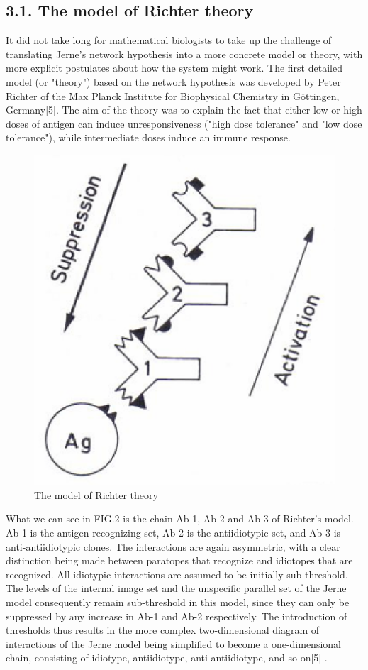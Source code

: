 \documentclass[Proceedings]{ascelike}
\begin{document}
\subsection{3.1. The model of Richter theory}
It did not take long for mathematical biologists to take up the challenge of translating Jerne's network hypothesis into a more concrete model or theory, with more explicit postulates about how the system might work. The first detailed model (or "theory") based on the network hypothesis was developed by Peter Richter of the Max Planck Institute for Biophysical Chemistry in Göttingen, Germany[5]. The aim of the theory was to explain the fact that either low or high doses of antigen can induce unresponsiveness ("high dose tolerance" and "low dose tolerance"), while intermediate doses induce an immune response. 
\begin{figure}
\centering
    \includegraphics[scale=0.5] {img/network_model_richter.png}
    \caption{The model of Richter theory}
\end{figure}
\par
What we can see in FIG.2 is the chain Ab-1, Ab-2 and Ab-3 of Richter’s model. Ab-1 is the antigen recognizing set, Ab-2 is the antiidiotypic set, and Ab-3 is anti-antiidiotypic clones. The interactions are again asymmetric, with a clear distinction being made between paratopes that recognize and idiotopes that are recognized. All idiotypic interactions are assumed to be initially sub-threshold. The levels of the internal image set and the unspecific parallel set of the Jerne model consequently remain sub-threshold in this model, since they can only be suppressed by any increase in Ab-1 and Ab-2 respectively. The introduction of thresholds thus results in the more complex two-dimensional diagram of interactions of the Jerne model being simplified to become a one-dimensional chain, consisting of idiotype, antiidiotype, anti-antiidiotype, and so on[5] .
\end{document}
